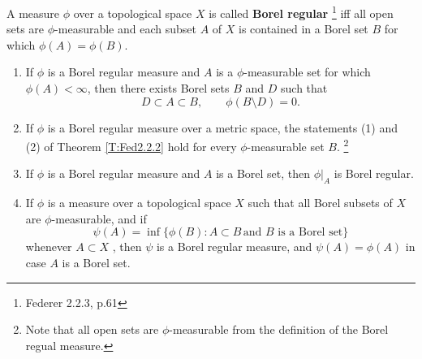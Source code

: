 \begin{definition}
A measure $\phi$ over a topological space $X$ is called 
\textbf{Borel regular}
\footnote{Federer 2.2.3, p.61}
iff all open sets are $\phi$-measurable and each subset $A$ of $X$ is contained 
in a Borel set $B$ for which $\phi(A)=\phi(B)$.
\end{definition}

\begin{proposition} \label{P:borel_reg}
\begin{enumerate}
\item[(1)] If $\phi$ is a Borel regular measure and $A$ is a $\phi$-measurable 
  set for which $\phi(A)<\infty$, then there exists Borel sets $B$ and $D$ such 
  that
  \[
    D\subset A\subset B, \qquad \phi(B\setminus D)=0.
  \]
\item[(2)] If $\phi$ is a Borel regular measure over a metric space, the
  statements (1) and (2) of Theorem \ref{T:Fed2.2.2} hold for every
  $\phi$-measurable set $B$.
  \footnote{Note that all open sets are $\phi$-measurable from the definition of
      the Borel regual measure.}
\item[(3)] If $\phi$ is a Borel regular measure and $A$ is a Borel set, then
  $\phi|_A$ is Borel regular.
\item[(4)] If $\phi$ is a measure over a topological space $X$ such that all
  Borel subsets of $X$ are $\phi$-measurable, and if 
  \[
    \psi(A) = \inf\{\phi(B): A\subset B \, \text{and $B$ is a Borel set} \}
  \]
  whenever $A\subset X$ , then $\psi$ is a Borel regular measure, and
  $\psi(A)=\phi(A)$ in case $A$ is a Borel set.
\end{enumerate}
\end{proposition}
